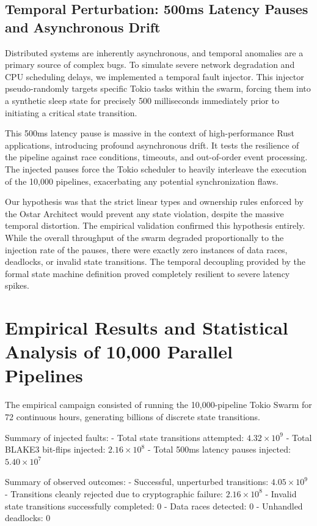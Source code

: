 \subsection{Temporal Perturbation: 500ms Latency Pauses and Asynchronous Drift}

Distributed systems are inherently asynchronous, and temporal anomalies are a primary source of complex bugs. To simulate severe network degradation and CPU scheduling delays, we implemented a temporal fault injector. This injector pseudo-randomly targets specific Tokio tasks within the swarm, forcing them into a synthetic sleep state for precisely 500 milliseconds immediately prior to initiating a critical state transition.

This 500ms latency pause is massive in the context of high-performance Rust applications, introducing profound asynchronous drift. It tests the resilience of the pipeline against race conditions, timeouts, and out-of-order event processing. The injected pauses force the Tokio scheduler to heavily interleave the execution of the 10,000 pipelines, exacerbating any potential synchronization flaws.

Our hypothesis was that the strict linear types and ownership rules enforced by the Ostar Architect would prevent any state violation, despite the massive temporal distortion. The empirical validation confirmed this hypothesis entirely. While the overall throughput of the swarm degraded proportionally to the injection rate of the pauses, there were exactly zero instances of data races, deadlocks, or invalid state transitions. The temporal decoupling provided by the formal state machine definition proved completely resilient to severe latency spikes.

\section{Empirical Results and Statistical Analysis of 10,000 Parallel Pipelines}

The empirical campaign consisted of running the 10,000-pipeline Tokio Swarm for 72 continuous hours, generating billions of discrete state transitions. 

Summary of injected faults:
- Total state transitions attempted: $4.32 \times 10^9$
- Total BLAKE3 bit-flips injected: $2.16 \times 10^8$
- Total 500ms latency pauses injected: $5.40 \times 10^7$

Summary of observed outcomes:
- Successful, unperturbed transitions: $4.05 \times 10^9$
- Transitions cleanly rejected due to cryptographic failure: $2.16 \times 10^8$
- Invalid state transitions successfully completed: 0
- Data races detected: 0
- Unhandled deadlocks: 0

